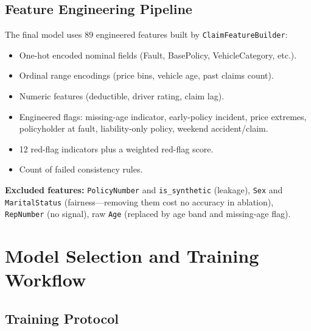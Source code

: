 \documentclass[12pt,a4paper]{article}
\begin{document}
\subsection{Feature Engineering Pipeline}

The final model uses 89 engineered features built by \texttt{ClaimFeatureBuilder}:

\begin{itemize}
    \item One-hot encoded nominal fields (Fault, BasePolicy, VehicleCategory, etc.).
    \item Ordinal range encodings (price bins, vehicle age, past claims count).
    \item Numeric features (deductible, driver rating, claim lag).
    \item Engineered flags: missing-age indicator, early-policy incident, price extremes, policyholder at fault, liability-only policy, weekend accident/claim.
    \item 12 red-flag indicators plus a weighted red-flag score.
    \item Count of failed consistency rules.
\end{itemize}

\textbf{Excluded features:} \texttt{PolicyNumber} and \texttt{is\_synthetic} (leakage), \texttt{Sex} and \texttt{MaritalStatus} (fairness---removing them cost no accuracy in ablation), \texttt{RepNumber} (no signal), raw \texttt{Age} (replaced by age band and missing-age flag).


\newpage
\section{Model Selection and Training Workflow}
\label{ch:model}

\subsection{Training Protocol}
\end{document}
